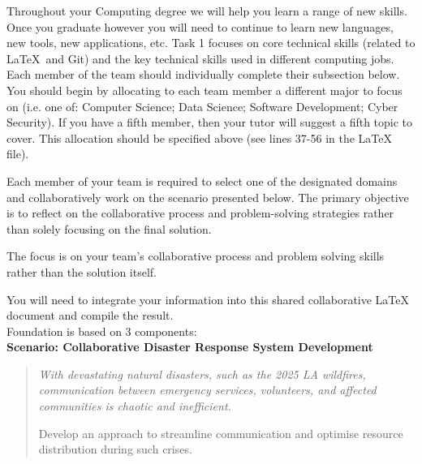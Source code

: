 \documentclass[a4paper, 11pt]{report}
\begin{document}
Throughout your Computing degree we will help you learn a range of new skills. Once you graduate however you will need to continue to learn new languages, new tools, new applications, etc. Task 1 focuses on core technical skills (related to \LaTeX\ and Git) and the key technical skills used in different computing jobs. Each member of the team should individually complete their subsection below. You should begin by allocating to each team member a different major to focus on (i.e. one of: Computer Science; Data Science; Software Development; Cyber Security). If you have a fifth member, then your tutor will suggest a fifth topic to cover. This allocation should be specified above (see lines 37-56 in the LaTeX file).

Each member of your team is required to select one of the designated domains and collaboratively work on the scenario presented below. The primary objective is to reflect on the collaborative process and problem-solving strategies rather than solely focusing on the final solution.

The focus is on your team’s collaborative process and problem solving skills rather than the solution itself. 

You will need to integrate your information into this shared collaborative LaTeX document and compile the result.\\[2mm]

Foundation is based on 3 components:\\[1mm]

\textbf{Scenario: Collaborative Disaster Response System Development}

{\begin{quote}\itshape
With devastating natural disasters, such as the 2025 LA wildfires, communication between emergency services, volunteers, and affected communities is chaotic and inefficient.

Develop an approach to streamline communication and optimise resource distribution during such crises. 
\end{quote}}
\end{document}
